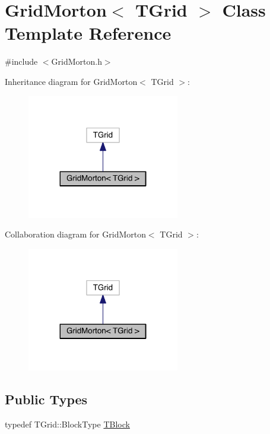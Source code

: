 \hypertarget{class_grid_morton}{}\section{Grid\+Morton$<$ T\+Grid $>$ Class Template Reference}
\label{class_grid_morton}


{\ttfamily \#include $<$Grid\+Morton.\+h$>$}



Inheritance diagram for Grid\+Morton$<$ T\+Grid $>$\+:\nopagebreak
\begin{figure}[H]
\begin{center}
\leavevmode
\includegraphics[width=188pt]{d0/dc4/class_grid_morton__inherit__graph}
\end{center}
\end{figure}


Collaboration diagram for Grid\+Morton$<$ T\+Grid $>$\+:\nopagebreak
\begin{figure}[H]
\begin{center}
\leavevmode
\includegraphics[width=188pt]{d1/df8/class_grid_morton__coll__graph}
\end{center}
\end{figure}
\subsection*{Public Types}
\begin{DoxyCompactItemize}
\item 
typedef T\+Grid\+::\+Block\+Type \hyperlink{class_grid_morton_a015e2b8a69c60cf84a8f1b5b42ce5b1c}{T\+Block}
\end{DoxyCompactItemize}
